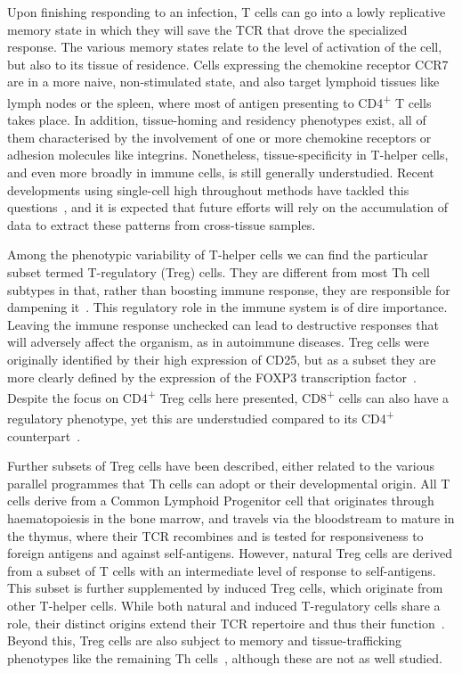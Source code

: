 Upon finishing responding to an infection, T cells can go into a lowly replicative memory state in which they will save the TCR that drove the specialized response. The various memory states relate to the level of activation of the cell, but also to its tissue of residence. Cells expressing the chemokine receptor CCR7 are in a more naive, non-stimulated state, and also target lymphoid tissues like lymph nodes or the spleen, where most of antigen presenting to CD4\textsuperscript{+} T cells takes place. In addition, tissue-homing and residency phenotypes exist, all of them characterised by the involvement of one or more chemokine receptors or adhesion molecules like integrins. Nonetheless, tissue-specificity in T-helper cells, and even more broadly in immune cells, is still generally understudied. Recent developments using single-cell high throughout methods have tackled this questions~\citep{wong_high-dimensional_2016,scott_transcription_2018}, and it is expected that future efforts will rely on the accumulation of data to extract these patterns from cross-tissue samples.

Among the phenotypic variability of T-helper cells we can find the particular subset termed T-regulatory (Treg) cells. They are different from most Th cell subtypes in that, rather than boosting immune response, they are responsible for dampening it~\citep{sakaguchi_immunologic_1995}. This regulatory role in the immune system is of dire importance. Leaving the immune response unchecked can lead to destructive responses that will adversely affect the organism, as in autoimmune diseases. Treg cells were originally identified by their high expression of CD25, but as a subset they are more clearly defined by the expression of the FOXP3 transcription factor~\citep{hori_control_2003}. Despite the focus on CD4\textsuperscript{+} Treg cells here presented, CD8\textsuperscript{+} cells can also have a regulatory phenotype, yet this are understudied compared to its CD4\textsuperscript{+} counterpart~\citep{yu_recent_2018}.

Further subsets of Treg cells have been described, either related to the various parallel programmes that Th cells can adopt or their developmental origin. All T cells derive from a Common Lymphoid Progenitor cell that originates through haematopoiesis in the bone marrow, and travels via the bloodstream to mature in the thymus, where their TCR recombines and is tested for responsiveness to foreign antigens and against self-antigens. However, natural Treg cells are derived from a subset of T cells with an intermediate level of response to self-antigens. This subset is further supplemented by induced Treg cells, which originate from other T-helper cells. While both natural and induced T-regulatory cells share a role, their distinct origins extend their TCR repertoire and thus their function~\citep{zhang_subsets_2014}. Beyond this, Treg cells are also subject to memory and tissue-trafficking phenotypes like the remaining Th cells~\citep{huehn_developmental_2004}, although these are not as well studied.

